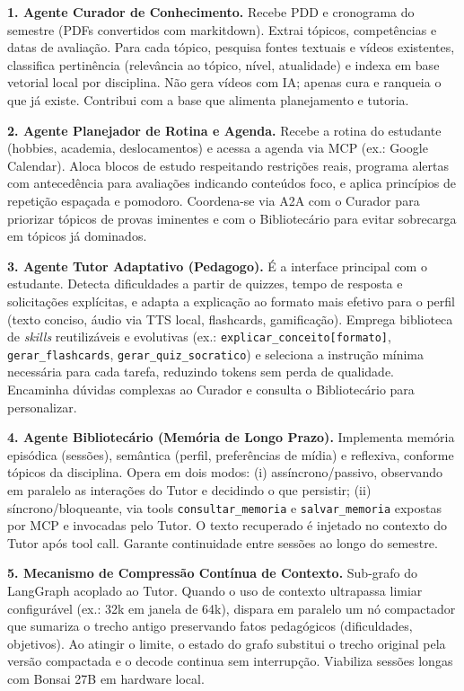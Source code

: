 \documentclass[12pt]{article}
\begin{document}
\textbf{1. Agente Curador de Conhecimento.} Recebe PDD e cronograma do semestre (PDFs convertidos com markitdown). Extrai tópicos, competências e datas de avaliação. Para cada tópico, pesquisa fontes textuais e vídeos existentes, classifica pertinência (relevância ao tópico, nível, atualidade) e indexa em base vetorial local por disciplina. Não gera vídeos com IA; apenas cura e ranqueia o que já existe. Contribui com a base que alimenta planejamento e tutoria.

\textbf{2. Agente Planejador de Rotina e Agenda.} Recebe a rotina do estudante (hobbies, academia, deslocamentos) e acessa a agenda via MCP (ex.: Google Calendar). Aloca blocos de estudo respeitando restrições reais, programa alertas com antecedência para avaliações indicando conteúdos foco, e aplica princípios de repetição espaçada e pomodoro. Coordena-se via A2A com o Curador para priorizar tópicos de provas iminentes e com o Bibliotecário para evitar sobrecarga em tópicos já dominados.

\textbf{3. Agente Tutor Adaptativo (Pedagogo).} É a interface principal com o estudante. Detecta dificuldades a partir de quizzes, tempo de resposta e solicitações explícitas, e adapta a explicação ao formato mais efetivo para o perfil (texto conciso, áudio via TTS local, flashcards, gamificação). Emprega biblioteca de \textit{skills} reutilizáveis e evolutivas (ex.: \texttt{explicar\_conceito[formato]}, \texttt{gerar\_flashcards}, \texttt{gerar\_quiz\_socratico}) e seleciona a instrução mínima necessária para cada tarefa, reduzindo tokens sem perda de qualidade. Encaminha dúvidas complexas ao Curador e consulta o Bibliotecário para personalizar.

\textbf{4. Agente Bibliotecário (Memória de Longo Prazo).} Implementa memória episódica (sessões), semântica (perfil, preferências de mídia) e reflexiva, conforme tópicos da disciplina. Opera em dois modos: (i) assíncrono/passivo, observando em paralelo as interações do Tutor e decidindo o que persistir; (ii) síncrono/bloqueante, via tools \texttt{consultar\_memoria} e \texttt{salvar\_memoria} expostas por MCP e invocadas pelo Tutor. O texto recuperado é injetado no contexto do Tutor após tool call. Garante continuidade entre sessões ao longo do semestre.

\textbf{5. Mecanismo de Compressão Contínua de Contexto.} Sub-grafo do LangGraph acoplado ao Tutor. Quando o uso de contexto ultrapassa limiar configurável (ex.: 32k em janela de 64k), dispara em paralelo um nó compactador que sumariza o trecho antigo preservando fatos pedagógicos (dificuldades, objetivos). Ao atingir o limite, o estado do grafo substitui o trecho original pela versão compactada e o decode continua sem interrupção. Viabiliza sessões longas com Bonsai 27B em hardware local.
\end{document}
